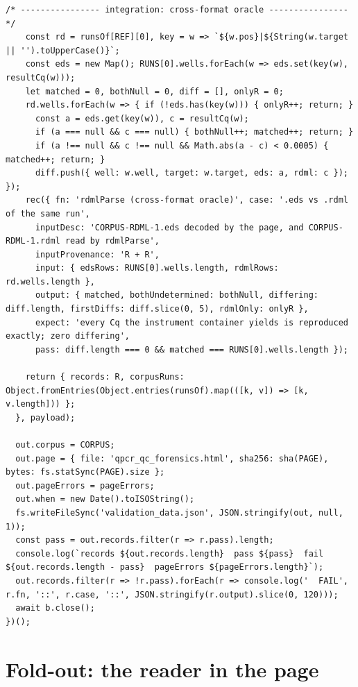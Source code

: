 \begin{lstlisting}[style=js]
    /* ---------------- integration: cross-format oracle ---------------- */
    const rd = runsOf[REF][0], key = w => `${w.pos}|${String(w.target || '').toUpperCase()}`;
    const eds = new Map(); RUNS[0].wells.forEach(w => eds.set(key(w), resultCq(w)));
    let matched = 0, bothNull = 0, diff = [], onlyR = 0;
    rd.wells.forEach(w => { if (!eds.has(key(w))) { onlyR++; return; }
      const a = eds.get(key(w)), c = resultCq(w);
      if (a === null && c === null) { bothNull++; matched++; return; }
      if (a !== null && c !== null && Math.abs(a - c) < 0.0005) { matched++; return; }
      diff.push({ well: w.well, target: w.target, eds: a, rdml: c }); });
    rec({ fn: 'rdmlParse (cross-format oracle)', case: '.eds vs .rdml of the same run',
      inputDesc: 'CORPUS-RDML-1.eds decoded by the page, and CORPUS-RDML-1.rdml read by rdmlParse',
      inputProvenance: 'R + R',
      input: { edsRows: RUNS[0].wells.length, rdmlRows: rd.wells.length },
      output: { matched, bothUndetermined: bothNull, differing: diff.length, firstDiffs: diff.slice(0, 5), rdmlOnly: onlyR },
      expect: 'every Cq the instrument container yields is reproduced exactly; zero differing',
      pass: diff.length === 0 && matched === RUNS[0].wells.length });

    return { records: R, corpusRuns: Object.fromEntries(Object.entries(runsOf).map(([k, v]) => [k, v.length])) };
  }, payload);

  out.corpus = CORPUS;
  out.page = { file: 'qpcr_qc_forensics.html', sha256: sha(PAGE), bytes: fs.statSync(PAGE).size };
  out.pageErrors = pageErrors;
  out.when = new Date().toISOString();
  fs.writeFileSync('validation_data.json', JSON.stringify(out, null, 1));
  const pass = out.records.filter(r => r.pass).length;
  console.log(`records ${out.records.length}  pass ${pass}  fail ${out.records.length - pass}  pageErrors ${pageErrors.length}`);
  out.records.filter(r => !r.pass).forEach(r => console.log('  FAIL', r.fn, '::', r.case, '::', JSON.stringify(r.output).slice(0, 120)));
  await b.close();
})();

\end{lstlisting}

\AThreeStart
\chapter{Fold-out: the reader in the page}\label{app:pipeline}


